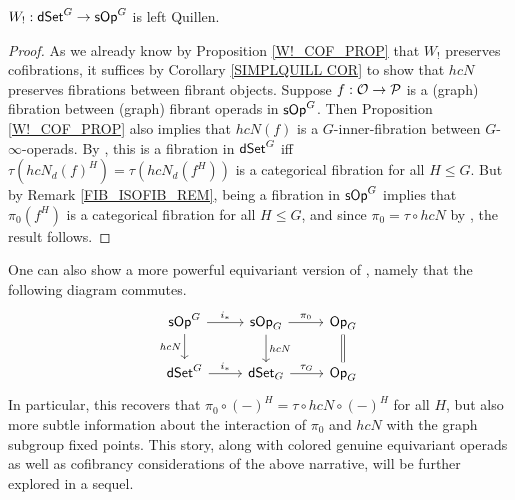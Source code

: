 \documentclass[a4paper,10pt
,draft
]{article}%
\renewcommand{\1}{\eta}%
\begin{document}
\begin{proposition}[{cf. \cite[Prop/ 4.9]{CM11}}]
      $W_!: \mathsf{dSet}^G \to \mathsf{sOp}^G$ is left Quillen.
\end{proposition}
\begin{proof}
      As we already know by Proposition \ref{W!_COF_PROP} that $W_!$ preserves cofibrations,
      it suffices by Corollary \ref{SIMPLQUILL COR} to show that $h c N$ preserves fibrations between fibrant objects.
      Suppose $f: \mathcal{O} \to \mathcal{P}$ is a (graph) fibration between (graph) fibrant operads in $\mathsf{sOp}^G$.
      Then Proposition \ref{W!_COF_PROP} also implies that $h c N (f)$ is a $G$-inner-fibration between $G$-$\infty$-operads.
      By \cite[Thm. 8.22]{Per_eds}, this is a fibration in $\mathsf{dSet}^G$ iff $\tau (h c N_d(f)^H) = \tau (h c N_d(f^H))$ is a categorical fibration for all $H \leq G$.
      But by Remark \ref{FIB_ISOFIB_REM}, being a fibration in $\mathsf{sOp}^G$ implies that $\pi_0(f^H)$ is a categorical fibration for all $H \leq G$, 
      and since $\pi_0 = \tau \circ h c N$ by \cite[Prop. 4.8]{CM11}, the result follows.
\end{proof}

\begin{remark}
      One can also show a more powerful equivariant version of \cite[Prop. 4.8]{CM11},
      namely that the following diagram commutes.
      \begin{equation}
            \begin{tikzcd}
                  \sOp^G \arrow[r, "i_{\**}"] \arrow[d, "h c N"']
                  &
                  \sOp_G \arrow[d, "h c N"] \arrow[r, "\pi_0"]
                  &
                  \Op_G \arrow[d, equal]
                  \\
                  \dSet^G \arrow[r, "i_{\**}"]
                  &
                  \dSet_G \arrow[r, "\tau_G"]
                  &
                  \Op_G
            \end{tikzcd}
      \end{equation}
      In particular, this recovers that $\pi_0 \circ (-)^H = \tau \circ h c N \circ (-)^H$ for all $H$,
      but also more subtle information about the interaction of $\pi_0$ and $h c N$ with the graph subgroup fixed points.
      This story, along with colored genuine equivariant operads as well as cofibrancy considerations of the above narrative,
      will be further explored in a sequel. 
\end{remark}

\end{document}
